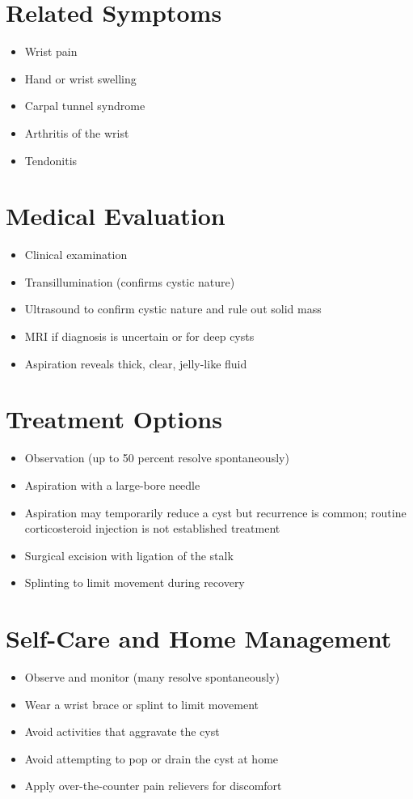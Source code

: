 \section*{Related Symptoms}
\begin{itemize}
\item Wrist pain
\item Hand or wrist swelling
\item Carpal tunnel syndrome
\item Arthritis of the wrist
\item Tendonitis
\end{itemize}

\section*{Medical Evaluation}
\begin{itemize}
\item Clinical examination
\item Transillumination (confirms cystic nature)
\item Ultrasound to confirm cystic nature and rule out solid mass
\item MRI if diagnosis is uncertain or for deep cysts
\item Aspiration reveals thick, clear, jelly-like fluid
\end{itemize}

\section*{Treatment Options}
\begin{itemize}
\item Observation (up to 50 percent resolve spontaneously)
\item Aspiration with a large-bore needle
\item Aspiration may temporarily reduce a cyst but recurrence is common; routine corticosteroid injection is not established treatment
\item Surgical excision with ligation of the stalk
\item Splinting to limit movement during recovery
\end{itemize}
\section*{Self-Care and Home Management}
\begin{itemize}
\item Observe and monitor (many resolve spontaneously)
\item Wear a wrist brace or splint to limit movement
\item Avoid activities that aggravate the cyst
\item Avoid attempting to pop or drain the cyst at home
\item Apply over-the-counter pain relievers for discomfort
\end{itemize}

